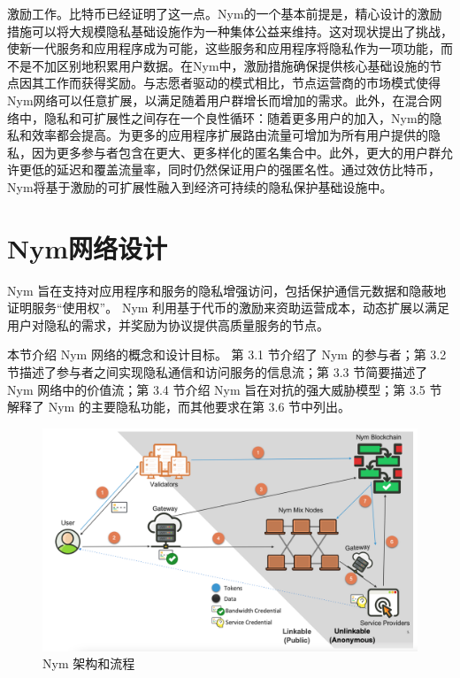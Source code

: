 \documentclass{article}
\begin{document}
	激励工作。比特币已经证明了这一点。Nym的一个基本前提是，精心设计的激励措施可以将大规模隐私基础设施作为一种集体公益来维持。这对现状提出了挑战，使新一代服务和应用程序成为可能，这些服务和应用程序将隐私作为一项功能，而不是不加区别地积累用户数据。在Nym中，激励措施确保提供核心基础设施的节点因其工作而获得奖励。与志愿者驱动的模式相比，节点运营商的市场模式使得Nym网络可以任意扩展，以满足随着用户群增长而增加的需求。此外，在混合网络中，隐私和可扩展性之间存在一个良性循环：随着更多用户的加入，Nym的隐私和效率都会提高。为更多的应用程序扩展路由流量可增加为所有用户提供的隐私，因为更多参与者包含在更大、更多样化的匿名集合中。此外，更大的用户群允许更低的延迟和覆盖流量率，同时仍然保证用户的强匿名性。通过效仿比特币，Nym将基于激励的可扩展性融入到经济可持续的隐私保护基础设施中。\newline
	
	
	\section{Nym网络设计}
	
	Nym 旨在支持对应用程序和服务的隐私增强访问，包括保护通信元数据和隐蔽地证明服务“使用权”。 Nym 利用基于代币的激励来资助运营成本，动态扩展以满足用户对隐私的需求，并奖励为协议提供高质量服务的节点。\newline

	本节介绍 Nym 网络的概念和设计目标。 第 3.1 节介绍了 Nym 的参与者；第 3.2 节描述了参与者之间实现隐私通信和访问服务的信息流；第 3.3 节简要描述了 Nym 网络中的价值流；第 3.4 节介绍 Nym 旨在对抗的强大威胁模型；第 3.5 节解释了 Nym 的主要隐私功能，而其他要求在第 3.6 节中列出。\newline
	
\begin{figure}
\centering
\includegraphics[width=1\textwidth]{image1.png} %
\caption{Nym 架构和流程} %
\label{图 1} %
\end{figure}
	
\end{document}
